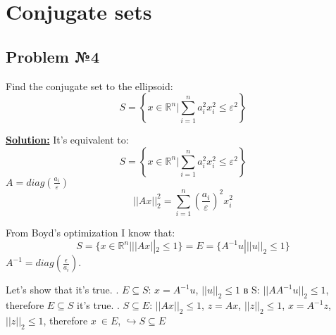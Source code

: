 \section{Conjugate sets}




\subsection{Problem №4}
Find the conjugate set to the ellipsoid:
\begin{equation*}
    S = \left\{ x \in \mathds{R}^n | \sum\limits_{i=1}^n a_i^2x_i^2 \leq \varepsilon^2 \right\}
\end{equation*}

\underline{\textbf{Solution:}}
It's equivalent to:
\begin{equation*}
    S = \left\{ x \in \mathds{R}^n | \sum\limits_{i=1}^n a_i^2x_i^2 \leq \varepsilon^2 \right\}
\end{equation*}
$A = diag(\frac{a_i}{\varepsilon})$
\begin{equation*}
    ||Ax||_2^2 = \sum\limits_{i=1}^n (\frac{a_i}{\varepsilon})^2x_i^2
\end{equation*}

From Boyd's optimization I know that:
\begin{equation*}
S = \{ x \in \mathds{R}^n | ||Ax||_2 \leq 1 \} = E = \{ A^{-1}u | ||u||_2 \leq 1\}    
\end{equation*}
$A^{-1} = diag(\frac{\epsilon}{a_i})$. 

Let's show that it's true.
. $E \subseteq S$: $x = A^{-1}u$, $||u||_2 \leq 1$ в S: $||AA^{-1}u||_2 \leq 1$, therefore $E \subseteq S$ it's true.
. $S \subseteq E$: $||Ax||_2 \leq 1$, $z = Ax$, $||z||_2 \leq 1$, $x = A^{-1}z$, $||z||_2 \leq 1$, therefore $x\ \in E$, $\hookrightarrow S \subseteq E$

